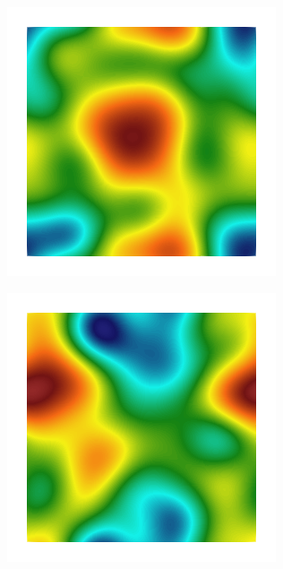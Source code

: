 \begin{figure}[!htb]
    \begin{subfigure}[b]{0.15\textwidth}
        \includegraphics[width=\textwidth]{past/figures/Gc_sqexp_cartesian_20_20_rho_0_seed_a.png}
    \end{subfigure}
    \begin{subfigure}[b]{0.15\textwidth}
        \includegraphics[width=\textwidth]{past/figures/psic_sqexp_cartesian_20_20_rho_0_seed_a.png}

\end{subfigure}
\end{figure}
